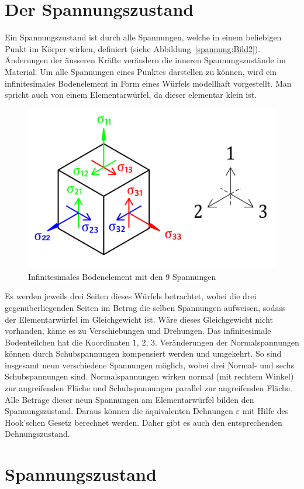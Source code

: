 \section{Der Spannungszustand\label{spannung:section:Der Spannungsustand}}
Ein Spannungszustand ist durch alle Spannungen, welche in einem beliebigen Punkt im Körper wirken, definiert (siehe Abbildung~\ref{spannung:Bild2}).
Änderungen der äusseren Kräfte verändern die inneren Spannungszustände im Material.
Um alle Spannungen eines Punktes darstellen zu können, wird ein infinitesimales Bodenelement in Form eines Würfels modellhaft vorgestellt.
Man spricht auch von einem Elementarwürfel, da dieser elementar klein ist.

\begin{figure}
	\centering
	\includegraphics[width=0.4\linewidth,keepaspectratio]{papers/spannung/Grafiken/Bild2.png}
	\caption{Infinitesimales Bodenelement mit den 9 Spannungen}
	\label{fig:Bild2}
\end{figure}

Es werden jeweils drei Seiten dieses Würfels betrachtet, wobei die drei gegenüberliegenden Seiten im Betrag die selben Spannungen aufweisen,
sodass der Elementarwürfel im Gleichgewicht ist.
Wäre dieses Gleichgewicht nicht vorhanden, käme es zu Verschiebungen und Drehungen.
Das infinitesimale Bodenteilchen hat die Koordinaten $1$, $2$, $3$.
Veränderungen der Normalspannungen können durch Schubspannungen kompensiert werden und umgekehrt.
So sind insgesamt neun verschiedene Spannungen möglich, wobei drei Normal- und sechs Schubspannungen sind.
Normalspannungen wirken normal (mit rechtem Winkel) zur angreifenden Fläche und Schubspannungen parallel zur angreifenden Fläche.
Alle Beträge dieser neun Spannungen am Elementarwürfel bilden den Spannungszustand.
Daraus können die äquivalenten Dehnungen $\varepsilon$ mit Hilfe des Hook'schen Gesetz berechnet werden.
Daher gibt es auch den entsprechenden Dehnungszustand.


\section{Spannungszustand\label{spannung:section:Spannungsustand}}

